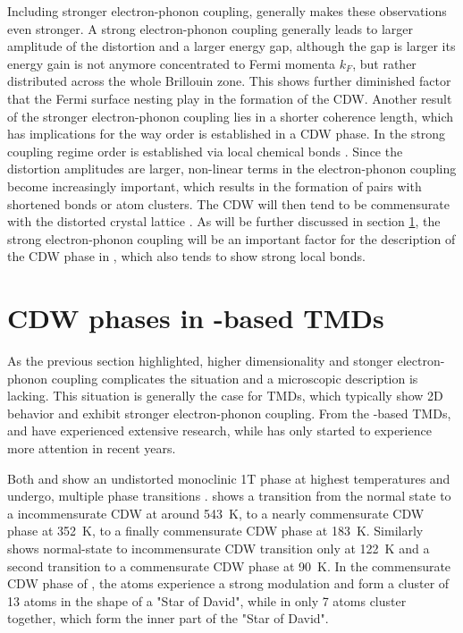 Including stronger electron-phonon coupling, generally makes these observations even stronger.
A strong electron-phonon coupling generally leads to larger amplitude of the distortion and a larger energy gap, although the gap is larger its energy gain is not anymore concentrated to Fermi momenta $k_F$, but rather distributed across the whole Brillouin zone.
This shows further diminished factor that the Fermi surface nesting play in the formation of the CDW.
Another result of the stronger electron-phonon coupling lies in a shorter coherence length, which has implications for the way order is established in a CDW phase.
In the strong coupling regime order is established via local chemical bonds \cite{rossnagel_origin_2011, whangbo_analogies_1992, mcmillan_microscopic_1977,haas_chemical_1978,inglesfield_bonding_1980}.
Since the distortion amplitudes are larger, non-linear terms in the electron-phonon coupling become increasingly important, which results in the formation of pairs with shortened bonds or atom clusters.
The CDW will then tend to be commensurate with the distorted crystal lattice \cite{rossnagel_origin_2011}.
As will be further discussed in section \ref{sec:cdw_tate2}, the strong electron-phonon coupling will be an important factor for the description of the CDW phase in , which also tends to show strong local bonds.


\section{CDW phases in -based TMDs}
\label{sec:cdw_tate2}

As the previous section highlighted, higher dimensionality and stonger electron-phonon coupling complicates the situation and a microscopic description is lacking.
This situation is generally the case for TMDs, which typically show 2D behavior and exhibit stronger electron-phonon coupling.
From the -based TMDs,  and  have experienced extensive research, while  has only started to experience more attention in recent years.

Both  and  show an undistorted monoclinic 1T phase at highest temperatures and undergo, multiple phase transitions \cite{pouget_structural_2024,lin_evidence_2022}.
 shows a transition from the normal state to a incommensurate CDW at around \qty{543}{\kelvin}, to a nearly commensurate CDW phase at \qty{352}{\kelvin}, to a finally commensurate CDW phase at \qty{183}{\kelvin}.
Similarly  shows normal-state to incommensurate CDW transition only at \qty{122}{\kelvin} and a second transition to a commensurate CDW phase at \qty{90}{\kelvin}.
In the commensurate CDW phase of , the  atoms experience a strong modulation and form a cluster of 13 atoms in the shape of a "Star of David", while in  only 7 atoms cluster together, which form the inner part of the "Star of David".

